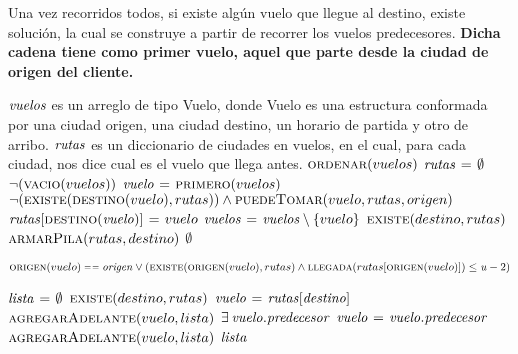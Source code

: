 Una vez recorridos todos, si existe algún vuelo que llegue al destino, existe 
solución, la cual se construye a partir de recorrer los vuelos predecesores.
\textbf{Dicha cadena tiene como primer vuelo, aquel que parte desde la ciudad 
de origen del cliente.}


\begin{codebox}
\li \Comment $\id{vuelos}$ es un arreglo de tipo Vuelo, donde Vuelo es una 
\li \Comment estructura conformada por una ciudad origen, una ciudad destino, 
\li \Comment un horario de partida y otro de arribo.
\li
\li \Comment $\id{rutas}$ es un diccionario de ciudades en vuelos, en el cual, 
\li \Comment para cada ciudad, nos dice cual es el vuelo que llega antes.
\li $\textnormal{\scshape ordenar}(vuelos)$
\li $\id{rutas} \gets \emptyset$
\li \While $\neg (\textnormal{\scshape vacio}(vuelos))$ 
\li     \Do
            $\id{vuelo} \gets \proc{primero}(vuelos)$
\li         \If $\neg (\textnormal{\scshape existe}(\textnormal{\scshape destino}(vuelo),rutas)) \land
                \textnormal{\scshape puedeTomar}(vuelo,rutas,origen)$ 
\li             \Then
                    $\id{rutas[\proc{destino}(vuelo)]} \gets vuelo$
                \End
\li         $\id{vuelos} \gets \id{vuelos} \setminus \{vuelo\}$
        \End
\li \If $\textnormal{\scshape existe}(destino,rutas)$ 
\li     \Then
            \Return $\textnormal{\scshape armarPila}(rutas,destino)$
\li     \Else
\li         \Return $\emptyset$
        \End
\end{codebox}


\vspace*{0.25cm}


\begin{codebox}
\li \Return $\proc{origen}(vuelo) \isequal \id{origen} \lor
            (\proc{existe}(\proc{origen}(vuelo),rutas) \land
             \proc{llegada}(rutas[\proc{origen}(vuelo)]) \leq
             \id{u} - 2)$
\end{codebox}


\vspace*{0.25cm}


\begin{codebox}
\li $\id{lista} \gets \emptyset$
\li \If $\textnormal{\scshape existe}(destino,rutas)$
\li     \Then
            $\id{vuelo} \gets \id{rutas[destino]}$
\li         $\textnormal{\scshape agregarAdelante}(vuelo,lista)$
\li         \While $\exists \hspace{0.07cm} \id{vuelo.predecesor}$ 
\li             \Do
                   $\id{vuelo} \gets \id{vuelo.predecesor}$  
\li                $\textnormal{\scshape agregarAdelante}(vuelo,lista)$  
                \End
\li     \Else
\li         \Return $\id{lista}$
        \End
\end{codebox}



